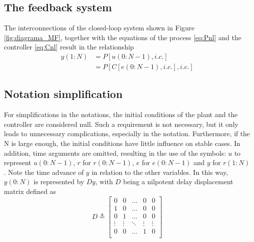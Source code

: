 \subsection{The feedback system}%
\label{sub:o_sistema_realimentado}

The interconnections of the closed-loop system shown in Figure \ref{fig:diagrama_MF}, together with the equations of the process \eqref{eq:Pnl} and the controller \eqref{eq:Cnl} result in the relationship
\begin{align}
   y(1: N) &=P[u(0{:} N-1), i . c .] \nonumber \\
   &=P[C[e(0{:} N-1), i . c .], i . c .]
   \label{eq:CLSnl}
\end{align}

\subsection{Notation simplification}%
\label{sub:simplificações_nas_notações}

For simplifications in the notations, the initial conditions of the plant and the controller are considered null. Such a requirement is not necessary, but it only leads to unnecessary complications, especially in the notation. Furthermore, if the N is large enough, the initial conditions have little influence on stable cases.
In addition, time arguments are omitted, resulting in the use of the symbols: $u$ to represent $u(0{:}N-1)$, $r$ for $r(0{:}N-1)$, $e$ for $e(0{:}N-1)$ and $y$ for $r(1{:}N)$. Note the time advance of $y$ in relation to the other variables. In this way, $y(0{:}N)$ is represented by $Dy$, with $D$ being a nilpotent delay displacement matrix defined as
\begin{equation}
   D \triangleq \begin{bmatrix} 
      0 & 0 & \dots & 0 & 0 \\
      1 & 0 & \dots & 0 & 0 \\
      0 & 1 & \dots & 0 & 0 \\
      \vdots & \vdots & \ddots & \vdots & \vdots \\
      0 & 0 & \dots & 1 & 0 \\
   \end{bmatrix} 
\label{eq:}
\end{equation}

